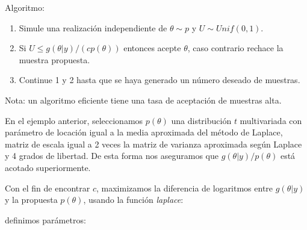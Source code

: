 \documentclass[
  12pt,
]{book}
\newenvironment{Shaded}{\begin{snugshade}}{\end{snugshade}}
\newcommand{\AttributeTok}[1]{\textcolor[rgb]{0.77,0.63,0.00}{#1}}
\newcommand{\ConstantTok}[1]{\textcolor[rgb]{0.00,0.00,0.00}{#1}}
\newcommand{\ControlFlowTok}[1]{\textcolor[rgb]{0.13,0.29,0.53}{\textbf{#1}}}
\newcommand{\DecValTok}[1]{\textcolor[rgb]{0.00,0.00,0.81}{#1}}
\newcommand{\FunctionTok}[1]{\textcolor[rgb]{0.00,0.00,0.00}{#1}}
\newcommand{\NormalTok}[1]{#1}
\newcommand{\OtherTok}[1]{\textcolor[rgb]{0.56,0.35,0.01}{#1}}
\newcommand{\SpecialCharTok}[1]{\textcolor[rgb]{0.00,0.00,0.00}{#1}}
\providecommand{\tightlist}{%
  \setlength{\itemsep}{0pt}\setlength{\parskip}{0pt}}
\begin{document}
Algoritmo:

\begin{enumerate}
\def\labelenumi{\arabic{enumi}.}
\tightlist
\item
  Simule una realización independiente de \(\theta \sim p\) y
  \(U\sim Unif(0,1)\).
\item
  Si \(U\leq g(\theta|y)/(cp(\theta))\) entonces acepte \(\theta\), caso
  contrario rechace la muestra propuesta.
\item
  Continue 1 y 2 hasta que se haya generado un número deseado de
  muestras.
\end{enumerate}

Nota: un algoritmo eficiente tiene una tasa de aceptación de muestras
alta.

En el ejemplo anterior, seleccionamos \(p(\theta)\) una distribución
\(t\) multivariada con parámetro de locación igual a la media aproximada
del método de Laplace, matriz de escala igual a 2 veces la matriz de
varianza aproximada según Laplace y 4 grados de libertad. De esta forma
nos aseguramos que \(g(\theta|y)/p(\theta)\) está acotado superiormente.

Con el fin de encontrar \(c\), maximizamos la diferencia de logaritmos
entre \(g(\theta|y)\) y la propuesta \(p(\theta)\), usando la función
\emph{laplace}:

\begin{Shaded}
\end{Shaded}

definimos parámetros:

\begin{Shaded}
\end{Shaded}
\end{document}
